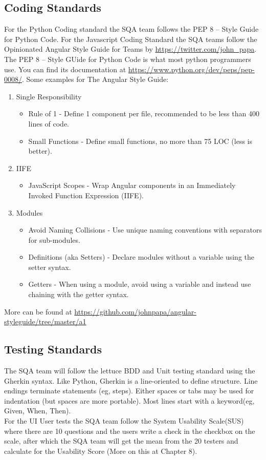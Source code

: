 \documentclass{report}
\begin{document}
\subsection{Coding Standards}
For the Python Coding standard the SQA team follows the PEP 8 -- Style Guide for Python Code. For the Javascript Coding Standard the SQA teams follow the Opinionated Angular Style Guide for Teams by \url {https://twitter.com/john_papa}. \\ 
The PEP 8 -- Style GUide for Python Code is what most python programmers use. You can find its documentation at \url {https://www.python.org/dev/peps/pep-0008/}.
Some examples for The Angular Style Guide:
\begin{enumerate}
\item Single Responsibility
	\begin{itemize}
	\item Rule of 1 - Define 1 component per file, recommended to be less than 400 lines of code.
	\item Small Functions - Define small functions, no more than 75 LOC (less is better).
	\end{itemize}
\item IIFE
	\begin{itemize}
	\item JavaScript Scopes - Wrap Angular components in an Immediately Invoked Function Expression (IIFE).
	\end{itemize}
\item Modules
	\begin{itemize}
	\item Avoid Naming Collisions - Use unique naming conventions with separators for sub-modules.
	\item Definitions (aka Setters) - Declare modules without a variable using the setter syntax.
	\item Getters - When using a module, avoid using a variable and instead use chaining with the getter syntax.
	\end{itemize}
\end{enumerate}
More can be found at \url {https://github.com/johnpapa/angular-styleguide/tree/master/a1}

\subsection{Testing Standards}
The SQA team will follow the lettuce BDD and Unit testing standard using the Gherkin syntax. Like Python, Gherkin is a line-oriented to define structure. Line endings terminate statements (eg, steps). Either spaces or tabs may be used for indentation (but spaces are more portable). Most lines start with a keyword(eg, Given, When, Then). \\
For the UI User tests the SQA team follow the System Usability Scale(SUS) where there are 10 questions and the users write a check in the checkbox on the scale, after which the SQA team will get the mean from the 20 testers and calculate for the Usability Score (More on this at Chapter 8). 
\end{document}
